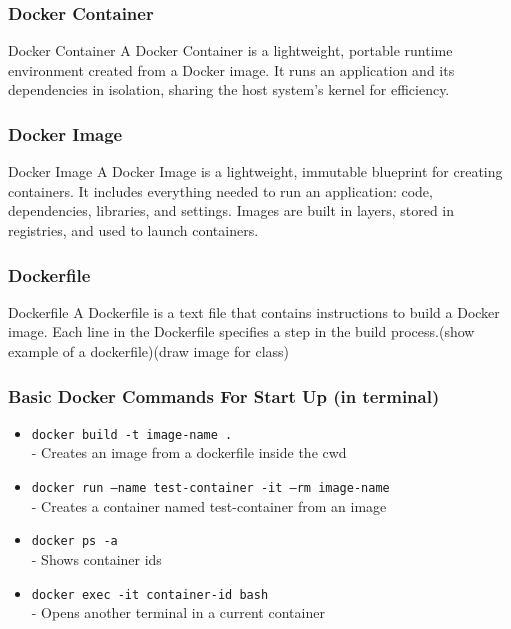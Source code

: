 \documentclass{beamer}
\begin{document}
\begin{frame}\frametitle{Docker Container}
\begin{block}{Docker Container}
A Docker Container is a lightweight, portable runtime environment created from 
a Docker image. It runs an application and its dependencies in isolation, 
sharing the host system's kernel for efficiency.
\end{block}
\end{frame}


\begin{frame}\frametitle{Docker Image}
\begin{block}{Docker Image}
A Docker Image is a lightweight, immutable blueprint for creating containers. 
It includes everything needed to run an application: code, dependencies, 
libraries, and settings. Images are built in layers, stored in registries,
and used to launch containers.
\end{block}
\end{frame}


\begin{frame}\frametitle{Dockerfile}
\begin{block}{Dockerfile}
A Dockerfile is a text file that contains instructions to build a Docker image.
Each line in the Dockerfile specifies a step in the build process.(show example of a dockerfile)(draw image for class)
\end{block}
\end{frame}


\begin{frame}\frametitle{Basic Docker Commands For Start Up (in terminal)}
\begin{itemize}
\item \texttt{docker build -t image-name .}\\- Creates an image from a dockerfile inside the cwd
\item \texttt{docker run --name test-container -it --rm image-name}\\- Creates a container named test-container from an image  
\item \texttt{docker ps -a}\\- Shows container ids
\item \texttt{docker exec -it container-id bash}\\- Opens another terminal in a current container
\end{itemize}
\end{frame}
    
\end{document}
